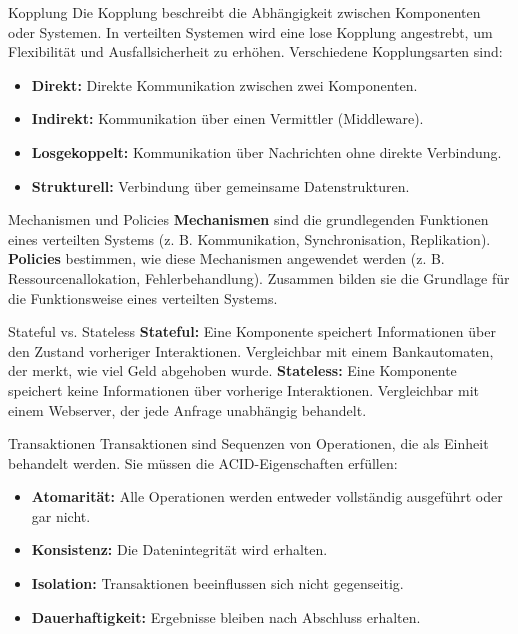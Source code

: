 \documentclass{beamer}
\begin{document}
\begin{frame}{Kopplung}
    Die Kopplung beschreibt die Abhängigkeit zwischen Komponenten oder Systemen. In verteilten Systemen wird eine lose Kopplung angestrebt, um Flexibilität und Ausfallsicherheit zu erhöhen. Verschiedene Kopplungsarten sind:
    \begin{itemize}
        \item \textbf{Direkt:} Direkte Kommunikation zwischen zwei Komponenten.
        \item \textbf{Indirekt:} Kommunikation über einen Vermittler (Middleware).
        \item \textbf{Losgekoppelt:} Kommunikation über Nachrichten ohne direkte Verbindung.
        \item \textbf{Strukturell:} Verbindung über gemeinsame Datenstrukturen.
    \end{itemize}
\end{frame}

\begin{frame}{Mechanismen und Policies}
    \textbf{Mechanismen} sind die grundlegenden Funktionen eines verteilten Systems (z. B. Kommunikation, Synchronisation, Replikation). \newline
    \textbf{Policies} bestimmen, wie diese Mechanismen angewendet werden (z. B. Ressourcenallokation, Fehlerbehandlung). Zusammen bilden sie die Grundlage für die Funktionsweise eines verteilten Systems.
\end{frame}

\begin{frame}{Stateful vs. Stateless}
    \textbf{Stateful:} Eine Komponente speichert Informationen über den Zustand vorheriger Interaktionen. Vergleichbar mit einem Bankautomaten, der merkt, wie viel Geld abgehoben wurde. \newline
    \textbf{Stateless:} Eine Komponente speichert keine Informationen über vorherige Interaktionen. Vergleichbar mit einem Webserver, der jede Anfrage unabhängig behandelt.
\end{frame}

\begin{frame}{Transaktionen}
    Transaktionen sind Sequenzen von Operationen, die als Einheit behandelt werden. Sie müssen die ACID-Eigenschaften erfüllen:
    \begin{itemize}
        \item \textbf{Atomarität:} Alle Operationen werden entweder vollständig ausgeführt oder gar nicht.
        \item \textbf{Konsistenz:} Die Datenintegrität wird erhalten.
        \item \textbf{Isolation:} Transaktionen beeinflussen sich nicht gegenseitig.
        \item \textbf{Dauerhaftigkeit:} Ergebnisse bleiben nach Abschluss erhalten.
    \end{itemize}
\end{frame}
\end{document}
